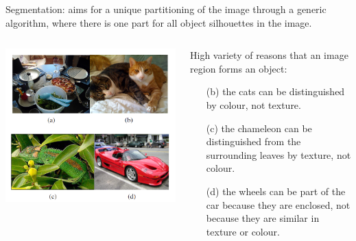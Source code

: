 \begin{frame}[allowframebreaks]
\medskip


\framebreak

Segmentation: aims for
a unique partitioning of the image through a generic algorithm,
where there is one part for all object silhouettes in the image.

\medskip

\begin{columns} %

	\begin{column}{.5\textwidth}
		\begin{center}
			\includegraphics[scale=0.6]{figs/selectivesearch_pictures}
		\end{center}
	\end{column}%



	\begin{column}{.4\textwidth}
		High variety of reasons that an image region forms an object:

		\begin{itemize}
			\item[(b)] the cats can be distinguished by colour, not
			texture.

			\item[(c)] the chameleon can be distinguished from the surrounding
			leaves by texture, not colour.

			\item[(d)]  the wheels can be part
			of the car because they are enclosed, not because they are similar
			in texture or colour.


\end{itemize}
\end{column}
\end{columns}
\end{frame}
